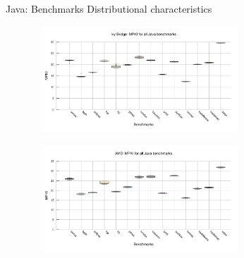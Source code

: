 \documentclass[10pt]{beamer}
\begin{document}
\begin{frame}{Java: Benchmarks Distributional characteristics}
	\begin{minipage}{\textwidth}
		\begin{figure}
        \includegraphics[width=8cm, height=4cm]{figures/java_box_ivy_bridge.pdf}
		\end{figure}
	\end{minipage}
		\begin{minipage}{\textwidth}
			\begin{figure}
				\includegraphics[width=8cm, height=4cm]{figures/java_box_amd.pdf}
			\end{figure}
		\end{minipage}
\end{frame}
\end{document}
